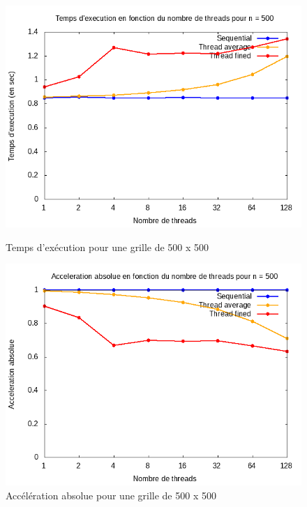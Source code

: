 \documentclass[10pt,a4paper]{article}
\begin{document}
\begin{figure}[!tbp]
  \centering
  \begin{minipage}[b]{0.49\textwidth}
	\includegraphics[width=\textwidth]{./Time/size_500_time.png}
    \caption{Temps d'exécution pour une grille de 500 x 500}
  \end{minipage}
  \hfill
  \begin{minipage}[b]{0.49\textwidth}
    \includegraphics[width=\textwidth]{./Time/size_500_acceleration.png}
    \caption{Accélération absolue pour une grille de 500 x 500}
  \end{minipage}
\end{figure}
\end{document}
